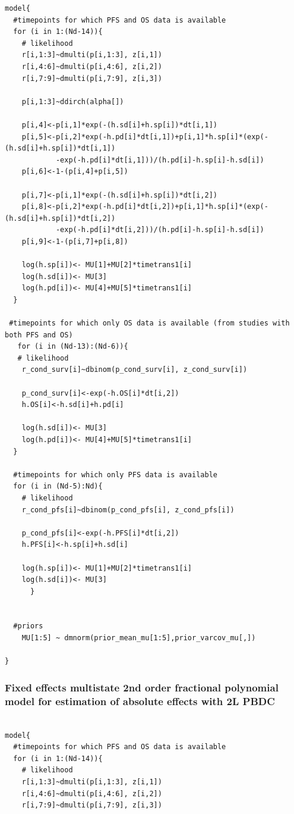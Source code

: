 \documentclass[11pt,final,fleqn]{article}\usepackage[]{graphicx}\usepackage[]{color}
\theoremstyle{plain}
\begin{document}
\begin{appendices}
\begin{verbatim}
model{
  #timepoints for which PFS and OS data is available
  for (i in 1:(Nd-14)){
    # likelihood
    r[i,1:3]~dmulti(p[i,1:3], z[i,1]) 
    r[i,4:6]~dmulti(p[i,4:6], z[i,2]) 
    r[i,7:9]~dmulti(p[i,7:9], z[i,3]) 
    
    p[i,1:3]~ddirch(alpha[])
    
    p[i,4]<-p[i,1]*exp(-(h.sd[i]+h.sp[i])*dt[i,1])
    p[i,5]<-p[i,2]*exp(-h.pd[i]*dt[i,1])+p[i,1]*h.sp[i]*(exp(-(h.sd[i]+h.sp[i])*dt[i,1])
    		-exp(-h.pd[i]*dt[i,1]))/(h.pd[i]-h.sp[i]-h.sd[i])
    p[i,6]<-1-(p[i,4]+p[i,5])
    
    p[i,7]<-p[i,1]*exp(-(h.sd[i]+h.sp[i])*dt[i,2])
    p[i,8]<-p[i,2]*exp(-h.pd[i]*dt[i,2])+p[i,1]*h.sp[i]*(exp(-(h.sd[i]+h.sp[i])*dt[i,2])
    		-exp(-h.pd[i]*dt[i,2]))/(h.pd[i]-h.sp[i]-h.sd[i])
    p[i,9]<-1-(p[i,7]+p[i,8])
    
    log(h.sp[i])<- MU[1]+MU[2]*timetrans1[i] 
    log(h.sd[i])<- MU[3]
    log(h.pd[i])<- MU[4]+MU[5]*timetrans1[i]
  }
  
 #timepoints for which only OS data is available (from studies with both PFS and OS)
   for (i in (Nd-13):(Nd-6)){
   # likelihood
    r_cond_surv[i]~dbinom(p_cond_surv[i], z_cond_surv[i]) 
    
    p_cond_surv[i]<-exp(-h.OS[i]*dt[i,2])
    h.OS[i]<-h.sd[i]+h.pd[i]
    
    log(h.sd[i])<- MU[3] 
    log(h.pd[i])<- MU[4]+MU[5]*timetrans1[i]
  }
    
  #timepoints for which only PFS data is available 
  for (i in (Nd-5):Nd){
    # likelihood
    r_cond_pfs[i]~dbinom(p_cond_pfs[i], z_cond_pfs[i]) 
    
    p_cond_pfs[i]<-exp(-h.PFS[i]*dt[i,2])
    h.PFS[i]<-h.sp[i]+h.sd[i]
    
    log(h.sp[i])<- MU[1]+MU[2]*timetrans1[i]
    log(h.sd[i])<- MU[3] 
      }
  
  
  #priors
    MU[1:5] ~ dmnorm(prior_mean_mu[1:5],prior_varcov_mu[,]) 

}

\end{verbatim}

\subsubsection{Fixed effects multistate 2nd order fractional polynomial  model for estimation of absolute effects with 2L PBDC} 
\begin{verbatim} 

model{
  #timepoints for which PFS and OS data is available
  for (i in 1:(Nd-14)){
    # likelihood
    r[i,1:3]~dmulti(p[i,1:3], z[i,1]) 
    r[i,4:6]~dmulti(p[i,4:6], z[i,2]) 
    r[i,7:9]~dmulti(p[i,7:9], z[i,3]) 
    

\end{verbatim}
\end{appendices}
\end{document}
